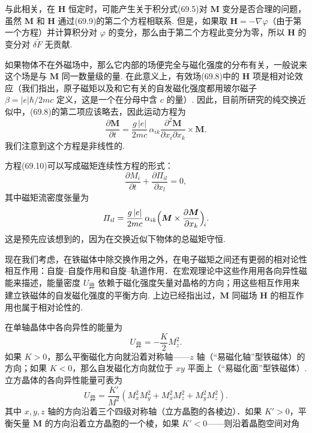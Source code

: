 与此相关，在 $\bm{H}$ 恒定时，可能产生关于积分式(69.5)对 $\bm{M}$ 变分是否合理的问题，虽然 $\bm{M}$ 和 $\bm{H}$ 通过(69.9)的第二个方程相联系. 但是，如果取 $\bm{H}=-\nabla\varphi$（由于第一个方程）并计算积分对 $\varphi$ 的变分，那么由于第二个方程此变分为零，所以 $\bm{H}$ 的变分对 $\delta\tilde{F}$ 无贡献.

如果物体不在外磁场中，那么它内部的场便完全与磁化强度的分布有关，一般说来这个场是与 $\bm{M}$ 同一数量级的量. 在此意义上，有效场(69.8)中的 $\bm{H}$ 项是相对论效应（我们指出，原子磁矩以及和它有关的自发磁化强度都用玻尔磁子 $\beta=|e|\hbar/2mc$ 定义，这是一个在分母中含 $c$ 的量）. 因此，目前所研究的纯交换近似中，(69.8)的第二项应该略去，因此运动方程为
\begin{equation}
\frac{\partial\bm{M}}{\partial t}=\frac{g\,|e|}{2mc}\,\alpha_{ik}
\frac{\partial^2\bm{M}}{\partial x_i\partial x_k}\times\bm{M}.
\end{equation}
我们注意到这个方程是非线性的.

方程(69.10)可以写成磁矩连续性方程的形式：
\begin{equation}
\frac{\partial M_i}{\partial t}+\frac{\partial\varPi_{il}}{\partial x_l}=0,
\end{equation}
其中磁矩流密度张量为
\begin{equation*}
\varPi_{il}=\frac{g\,|e|}{2mc}\,\alpha_{ik}
\Bigl(\bm{M}\times\frac{\partial\bm{M}}{\partial x_k}\Bigr)_{\!i}.
\end{equation*}
这是预先应该想到的，因为在交换近似下物体的总磁矩守恒.

现在我们考虑，在铁磁体中除交换作用之外，在电子磁矩之间还有更弱的相对论性相互作用：自旋–自旋作用和自旋–轨道作用．在宏观理论中这些作用用各向异性磁能来描述，能量密度 $U_{\text{异}}$ 依赖于磁化强度矢量对晶格的方向；用这些相互作用来建立铁磁体的自发磁化强度的平衡方向. 上边已经指出过，$\bm{M}$ 同磁场 $\bm{H}$ 的相互作用也属于相对论性的.

在单轴晶体中各向异性的能量为
\begin{equation}
U_{\text{异}}=-\frac{K}{2}M_z^2.
\end{equation}
如果 $K>0$，那么平衡磁化方向就沿着对称轴——$z$ 轴（“易磁化轴”型铁磁体）的方向；如果 $K<0$，那么自发磁化方向就位于 $xy$ 平面上（“易磁化面”型铁磁体）. 立方晶体的各向异性能量可表为
\begin{equation}
U_{\text{异}}=\frac{K'}{M^2}
(M_x^2M_y^2+M_x^2M_z^2+M_y^2M_z^2).
\end{equation}
其中 $x,y,z$ 轴的方向沿着三个四级对称轴（立方晶胞的各棱边）．如果 $K'>0$，平衡矢量 $\bm{M}$ 的方向沿着立方晶胞的一个棱，如果 $K'<0$——则沿着晶胞空间对角

